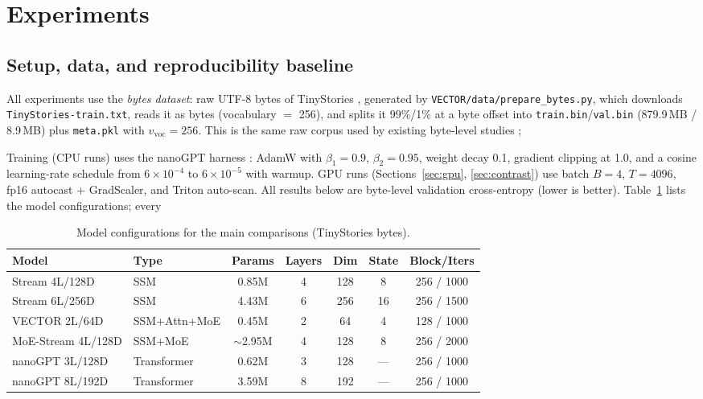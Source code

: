 \documentclass[11pt]{article}
\newcommand{\voc}{v_{\text{voc}}}
\begin{document}
\section{Experiments}\label{sec:experiments}

\subsection{Setup, data, and reproducibility baseline}\label{sec:setup}
All experiments use the \emph{bytes dataset}: raw UTF-8 bytes of TinyStories
\cite{TinyStories}, generated by \texttt{VECTOR/data/prepare\_bytes.py}, which
downloads \texttt{TinyStories-train.txt}, reads it as bytes (vocabulary $=$ 256),
and splits it 99\%/1\% at a byte offset into \texttt{train.bin}/\texttt{val.bin}
(879.9\,MB / 8.9\,MB) plus \texttt{meta.pkl} with $\voc=256$. This is the same
raw corpus used by existing byte-level studies \cite{Wang2024MambaByte};

Training (CPU runs) uses the nanoGPT harness \cite{Karpathy2023nanoGPT}:
AdamW with $\beta_1{=}0.9$, $\beta_2{=}0.95$, weight decay 0.1, gradient clipping
at 1.0, and a cosine learning-rate schedule from $6\times10^{-4}$ to
$6\times10^{-5}$ with warmup. GPU runs (Sections~\ref{sec:gpu},
\ref{sec:contrast}) use batch $B{=}4$, $T{=}4096$, fp16 autocast + GradScaler, and
Triton auto-scan. All results below are byte-level validation cross-entropy
(lower is better). Table~\ref{tab:configs} lists the model configurations; every

\begin{table}[t]
  \centering
  \small
  \begin{tabular}{llccccc}
    \toprule
    Model & Type & Params & Layers & Dim & State & Block/Iters \\
    \midrule
    Stream 4L/128D & SSM & 0.85M & 4 & 128 & 8 & 256 / 1000 \\
    Stream 6L/256D & SSM & 4.43M & 6 & 256 & 16 & 256 / 1500 \\
    VECTOR 2L/64D & SSM+Attn+MoE & 0.45M & 2 & 64 & 4 & 128 / 1000 \\
    MoE-Stream 4L/128D & SSM+MoE & $\sim$2.95M & 4 & 128 & 8 & 256 / 2000 \\
    nanoGPT 3L/128D & Transformer & 0.62M & 3 & 128 & --- & 256 / 1000 \\
    nanoGPT 8L/192D & Transformer & 3.59M & 8 & 192 & --- & 256 / 1000 \\
    \bottomrule
  \end{tabular}
  \caption{Model configurations for the main comparisons (TinyStories bytes).}
  \label{tab:configs}
\end{table}
\end{document}
